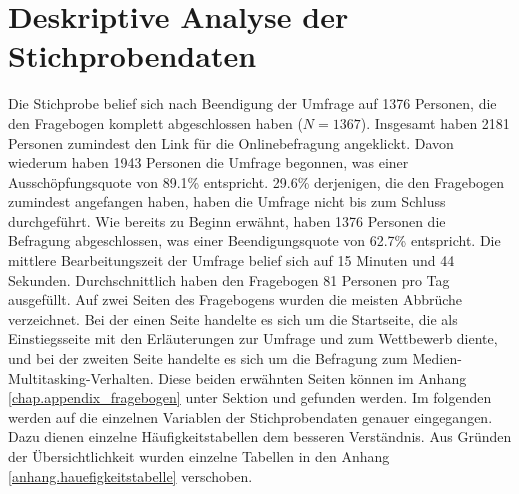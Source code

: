 \section{Deskriptive Analyse der Stichprobendaten}
\label{label.stichprobe}
Die Stichprobe belief sich nach Beendigung der Umfrage auf 1376 Personen, die den Fragebogen komplett abgeschlossen haben ($N = 1367$). Insgesamt haben 2181 Personen zumindest den Link für die Onlinebefragung angeklickt. Davon wiederum haben 1943 Personen die Umfrage begonnen, was einer Ausschöpfungsquote von 89.1\% entspricht. 29.6\% derjenigen, die den Fragebogen zumindest angefangen haben, haben die Umfrage nicht bis zum Schluss durchgeführt. Wie bereits zu Beginn erwähnt, haben 1376 Personen die Befragung abgeschlossen, was einer Beendigungsquote von 62.7\% entspricht. Die mittlere Bearbeitungszeit der Umfrage belief sich auf 15 Minuten und 44 Sekunden. Durchschnittlich haben den Fragebogen 81 Personen pro Tag ausgefüllt. Auf zwei Seiten des Fragebogens wurden die meisten Abbrüche verzeichnet. Bei der einen Seite handelte es sich um die Startseite, die als Einstiegsseite mit den Erläuterungen zur Umfrage und zum Wettbewerb diente, und bei der zweiten Seite handelte es sich um die Befragung zum Medien-Multitasking-Verhalten. Diese beiden erwähnten Seiten können im Anhang \ref{chap.appendix_fragebogen} unter Sektion  und  gefunden werden. Im folgenden werden auf die einzelnen Variablen der Stichprobendaten genauer eingegangen. Dazu dienen einzelne Häufigkeitstabellen dem besseren Verständnis. Aus Gründen der Übersichtlichkeit wurden einzelne Tabellen in den Anhang \ref{anhang.hauefigkeitstabelle} verschoben.

